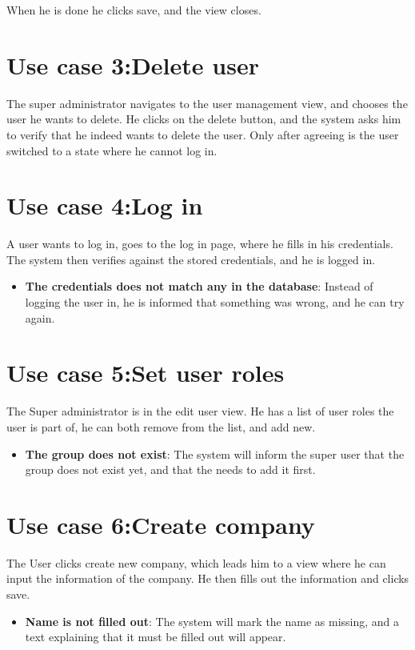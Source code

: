 When he is done he clicks save, and the view closes. 

\section{Use case 3:Delete user }
The super administrator navigates to the user management view, and chooses the
user he wants to delete. He clicks on the delete button, and the system asks him
to verify that he indeed wants to delete the user. Only after agreeing is the
user switched to a state where he cannot log in. 

\section{Use case 4:Log in }
A user wants to log in, goes to the log in page, where he fills in his
credentials. The system then verifies against the stored credentials, and he is
logged in. 
\begin{itemize}
  \item \textbf{The credentials does not match any in the database}: Instead of
    logging the user in, he is informed that something was wrong, and he can try
    again. 
\end{itemize}

\section{Use case 5:Set user roles }
The Super administrator is in the edit user view. He has a list of user roles
the user is part of, he can both remove from the list, and add new. 

\begin{itemize}
  \item \textbf{The group does not exist}: The system will inform the super user
    that the group does not exist yet, and that the needs to add it first. 
\end{itemize}

\section{Use case 6:Create company }
The User clicks create new company, which leads him to a view where he can input
the information of the company. He then fills out the information and clicks
save. 
\begin{itemize}
  \item \textbf{Name is not filled out}: The system will mark the name as
    missing, and a text explaining that it must be filled out will appear. 
\end{itemize}

